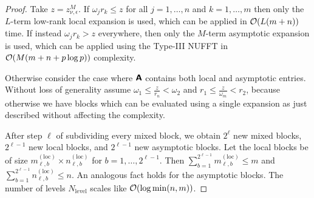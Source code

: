\begin{proof}
    Take $z = z_{\nu, \epsilon}^M$. If $\omega_j r_k \leq z$ for all
    $j=1,\dots,n$ and $k=1,\dots,m$ then only the $L$-term low-rank local
    expansion is used, which can be applied in $\mathcal{O}(L(m + n))$ time. If instead
    $\omega_j r_k > z$ everywhere, then only the $M$-term asymptotic expansion
    is used, which can be applied using the Type-III NUFFT in $\mathcal{O}(M(m + n +
    p\log p))$ complexity.

    Otherwise consider the case where $\bm{\mathsf{A}}$ contains both local and
    asymptotic entries. Without loss of generality assume $\omega_1 \leq
    \frac{z}{r_n} < \omega_2$ and $r_1 \leq \frac{z}{\omega_m} < r_2$, because
    otherwise we have blocks which can be evaluated using a single expansion as
    just described without affecting the complexity.

    After step $\ell$ of subdividing every mixed block, we obtain $2^{\ell}$ new
    mixed blocks, $2^{\ell-1}$ new local blocks, and $2^{\ell-1}$ new asymptotic
    blocks. Let the local blocks be of size $m_{\ell,b}^{(\text{loc})} \times
    n_{\ell,b}^{(\text{loc})}$ for $b = 1,\dots,2^{\ell-1}$. Then
    $\sum_{b=1}^{2^{\ell-1}} m_{\ell,b}^{(\text{loc})} \leq m$ and
    $\sum_{b=1}^{2^{\ell-1}} n_{\ell,b}^{(\text{loc})} \leq n$. An analogous
    fact holds for the asymptotic blocks. The number of levels
    $N_{\text{level}}$ scales like $\mathcal{O}(\log\min(n,m))$. 
    

\end{proof}
